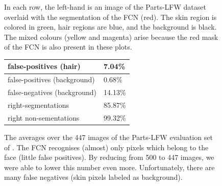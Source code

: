 \begin{figure}[H]
	
	\caption{In each row, the left-hand is an image of the Parts-LFW dataset overlaid with the segmentation of the FCN (red). The skin region is colored in green, hair regions are blue, and the background is black. The mixed colours (yellow and magenta) arise because the red mask of the FCN is also present in these plots.}
	\label{fig:tm}
\end{figure}

\begin{figure}
\begin{center}
\begin{tabular}{l|l} \hline
	false-positives (hair) & 7.04\%\\ \hline
	false-positives (background) & 0.68\%\\ \hline
	false-negatives (background) & 14.13\%\\ \hline
	right-segmentations & 85.87\%\\ \hline
	right non-sementations & 99.32\% \\ \hline
\end{tabular}
\end{center}
\caption{The averages over the 447 images of the Parts-LFW evaluation set of \cite{LFW_dataset}. The FCN recognises (almost) only pixels which belong to the face (little false positives). By reducing from 500 to 447 images, we were able to lower this number even more. Unfortunately, there are many false negatives (skin pixels labeled as background).} 
\label{fig:Parts-LFW}
\end{figure}

